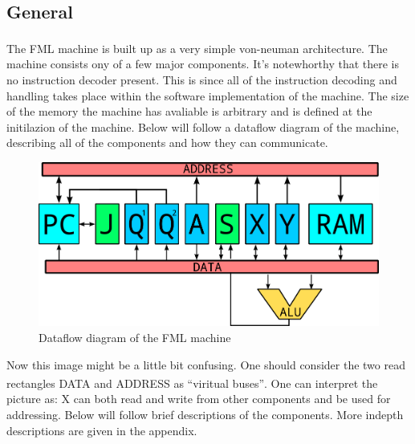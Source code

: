 \documentclass{article}
\begin{document}
\subsection{General}
The FML machine is built up as a very simple von-neuman
architecture\textsuperscript{\cite{neuman}}. The machine consists ony of a few
major components. It's notewhorthy that there is no instruction decoder present. 
This is since all of the instruction decoding
and handling takes place within the software implementation of the machine.
The size of the memory the machine has avaliable is arbitrary and is defined at
the initilazion of the machine. Below will follow a dataflow diagram of the
machine, describing all of the components and how they can communicate.  

\begin{figure}[H]
\includegraphics[width=\textwidth,height=\textheight,keepaspectratio]{Dataflow.png}
\caption{Dataflow diagram of the FML machine}
\end{figure}       

Now this image might be a little bit confusing. One should consider the two read
rectangles DATA and ADDRESS as ``viritual buses''\textsuperscript{\cite{bus}}.
One can interpret the picture as: X can both read and write from other components and be used for addressing.
Below will follow brief descriptions of the components. More indepth
descriptions are given in the appendix.
\end{document}
